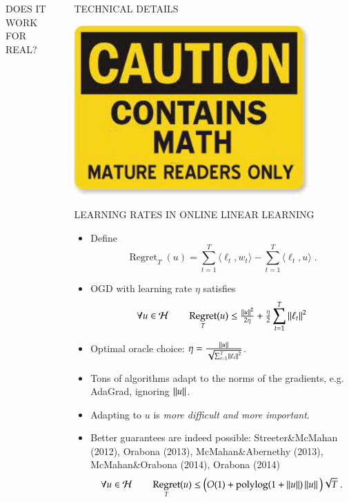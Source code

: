 \documentclass[final,t,serif,mathserif]{beamer}
\renewcommand{\H}{\mathcal{H}}  %
\DeclareMathOperator{\Regret}{Regret}
\DeclareMathOperator{\polylog}{polylog}
\def\blockspaceb{\vspace{0cm}}
\def\blockspacec{\vspace{-0.08cm}}
\begin{document}
\begin{frame}{}
\begin{columns}[t]
\begin{column}{.33\linewidth}
\begin{block}{DOES IT WORK FOR REAL?}
       \blockspaceb
       
    \end{block}
\end{column}


\begin{column}{.33\linewidth}

    \begin{block}{TECHNICAL DETAILS}
    \begin{minipage}{.98\linewidth}

    
    \center
    \includegraphics[width=9cm]{figs/MathCaution2}
    

    \begin{block}{LEARNING RATES IN ONLINE LINEAR LEARNING}
    \blockspacec
    
    \begin{itemize}
      \item Define
      \[
        \Regret_T(u) = \sum_{t=1}^T \langle \ell_t, w_t \rangle - \sum_{t=1}^T \langle \ell_t, u \rangle  \; .
      \]
      \item OGD with learning rate $\eta$ satisfies
	\[
	\forall u \in \H \qquad \Regret_T(u) \le \tfrac{\norm{u}^2}{2\eta} + \tfrac{\eta}{2} \sum_{t=1}^T \norm{\ell_t}^2
	\]
      \item Optimal oracle choice: $\eta = \frac{\left\|{u}\right\|}{\sqrt{\sum_{t=1}^T \left\|{\ell_t}\right\|^2}}$.
      \item Tons of algorithms adapt to the norms of the gradients, e.g. AdaGrad, ignoring $\left\|{u}\right\|$.
      \item Adapting to $u$ is \emph{more difficult and more important}.
      \item Better guarantees are indeed possible: Streeter\&McMahan (2012), Orabona (2013), McMahan\&Abernethy (2013), McMahan\&Orabona (2014), Orabona (2014) 
	\[
	\forall u \in \H \qquad \Regret_T(u) \le \big(O(1)+\polylog(1 + \norm{u})\norm{u} \big) \sqrt{T} \; .
	\]
    \end{itemize}
    

\end{block}
\end{minipage}
\end{block}
\end{column}
\end{columns}
\end{frame}
\end{document}
